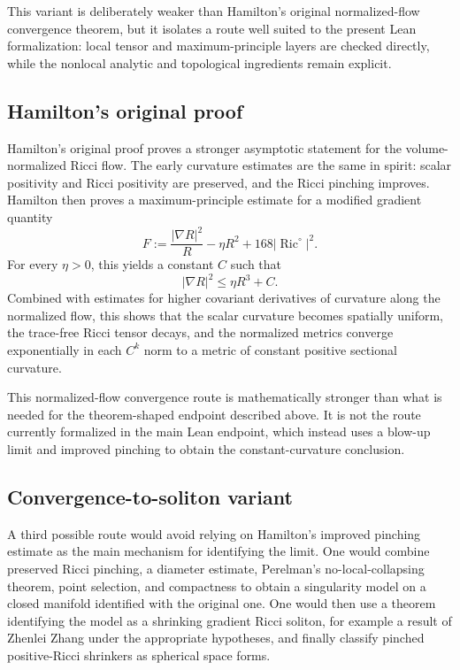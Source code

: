 \documentclass[11pt]{article}
\theoremstyle{plain}
\theoremstyle{definition}
\theoremstyle{remark}
\newcommand{\Ric}{\operatorname{Ric}}
\newcommand{\norm}[1]{\left|#1\right|}
\begin{document}
This variant is deliberately weaker than Hamilton's original normalized-flow
convergence theorem, but it isolates a route well suited to the present Lean
formalization: local tensor and maximum-principle layers are checked directly,
while the nonlocal analytic and topological ingredients remain explicit.

\subsection{Hamilton's original proof}

Hamilton's original proof proves a stronger asymptotic statement for the
volume-normalized Ricci flow.  The early curvature estimates are the same in
spirit: scalar positivity and Ricci positivity are preserved, and the Ricci
pinching improves.  Hamilton then proves a maximum-principle estimate for a
modified gradient quantity
\[
  F:= \frac{\norm{\nabla R}^2}{R}-\eta R^2+168\norm{\Ric^\circ}^2.
\]
For every \(\eta>0\), this yields a constant \(C\) such that
\[
  \norm{\nabla R}^2\le \eta R^3+C.
\]
Combined with estimates for higher covariant derivatives of curvature along the
normalized flow, this shows that the scalar curvature becomes spatially uniform,
the trace-free Ricci tensor decays, and the normalized metrics converge
exponentially in each \(C^k\) norm to a metric of constant positive sectional
curvature.

This normalized-flow convergence route is mathematically stronger than what is
needed for the theorem-shaped endpoint described above.  It is not the route
currently formalized in the main Lean endpoint, which instead uses a blow-up
limit and improved pinching to obtain the constant-curvature conclusion.

\subsection{Convergence-to-soliton variant}

A third possible route would avoid relying on Hamilton's improved pinching
estimate as the main mechanism for identifying the limit.  One would combine
preserved Ricci pinching, a diameter estimate, Perelman's no-local-collapsing
theorem, point selection, and compactness to obtain a singularity model on a
closed manifold identified with the original one.  One would then use a theorem
identifying the model as a shrinking gradient Ricci soliton, for example a
result of Zhenlei Zhang under the appropriate hypotheses, and finally classify
pinched positive-Ricci shrinkers as spherical space forms.
\end{document}
